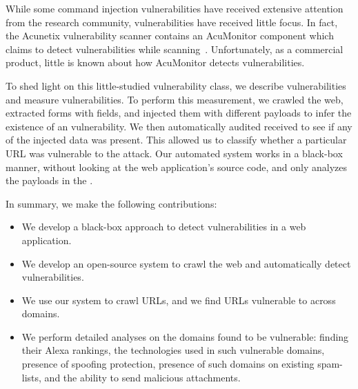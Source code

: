 While some command injection vulnerabilities have received extensive attention from the research community, \ehi vulnerabilities have received little focus. In fact, the Acunetix vulnerability scanner contains an AcuMonitor component which claims to detect \ehi vulnerabilities while scanning~\cite{acumonitor}. Unfortunately, as a commercial product, little is known about how AcuMonitor detects \ehi vulnerabilities. 

To shed light on this little-studied vulnerability class, we describe
\ehi vulnerabilities and measure \ehi vulnerabilities. To perform this
measurement, we crawled the web, extracted forms with \email fields,
and injected them with different payloads to infer the existence of an
\ehi vulnerability. We then automatically audited received \emails to
see if any of the injected data was present. This allowed us to
classify whether a particular URL was vulnerable to the attack. Our
automated system works in a black-box manner, without looking at the
web application's source code, and only analyzes the payloads in the
\emails.

In summary, we make the following contributions:
\begin{itemize}

\item We develop a black-box approach to detect \ehi vulnerabilities in a web application.

\item We develop an open-source system to crawl the web and automatically detect \ehi vulnerabilities.

\item We use our system to crawl \urls URLs, and we find \success URLs vulnerable to \ehi across \domains domains. 

\item We perform detailed analyses on the domains found to be vulnerable: finding their Alexa rankings, the technologies used in such vulnerable domains, presence of \email spoofing protection, presence of such domains on existing spam-lists, and the ability to send malicious attachments.

\end{itemize}
